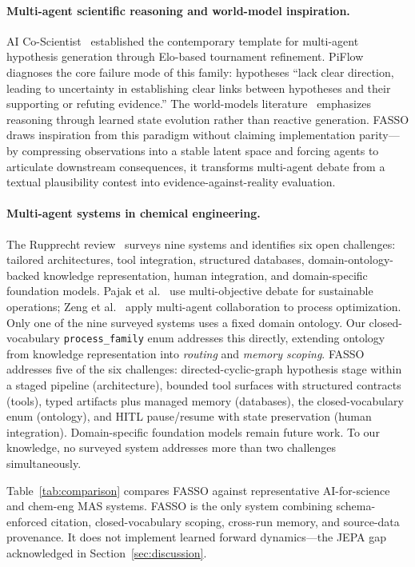 \documentclass[11pt]{article}
\begin{document}
\paragraph{Multi-agent scientific reasoning and world-model inspiration.} 
AI Co-Scientist~\citep{aicoscientist} established the contemporary template for multi-agent hypothesis generation through Elo-based tournament refinement. PiFlow~\citep{piflow} diagnoses the core failure mode of this family: hypotheses ``lack clear direction, leading to uncertainty in establishing clear links between hypotheses and their supporting or refuting evidence.'' The world-models literature~\citep{lecun2022,ha2018,hafner2023} emphasizes reasoning through learned state evolution rather than reactive generation. FASSO draws inspiration from this paradigm without claiming implementation parity—by compressing observations into a stable latent space and forcing agents to articulate downstream consequences, it transforms multi-agent debate from a textual plausibility contest into evidence-against-reality evaluation.

\paragraph{Multi-agent systems in chemical engineering.} 
The Rupprecht review~\citep{rupprecht2026} surveys nine systems and identifies six open challenges: tailored architectures, tool integration, structured databases, domain-ontology-backed knowledge representation, human integration, and domain-specific foundation models. Pajak et al.~\citep{pajak} use multi-objective debate for sustainable operations; Zeng et al.~\citep{zeng} apply multi-agent collaboration to process optimization. Only one of the nine surveyed systems uses a fixed domain ontology. Our closed-vocabulary \texttt{process\_family} enum addresses this directly, extending ontology from knowledge representation into \emph{routing} and \emph{memory scoping}. FASSO addresses five of the six challenges: directed-cyclic-graph hypothesis stage within a staged pipeline (architecture), bounded tool surfaces with structured contracts (tools), typed artifacts plus managed memory (databases), the closed-vocabulary enum (ontology), and HITL pause/resume with state preservation (human integration). Domain-specific foundation models remain future work. To our knowledge, no surveyed system addresses more than two challenges simultaneously.

Table~\ref{tab:comparison} compares FASSO against representative AI-for-science and chem-eng MAS systems. FASSO is the only system combining schema-enforced citation, closed-vocabulary scoping, cross-run memory, and source-data provenance. It does not implement learned forward dynamics—the JEPA gap acknowledged in Section~\ref{sec:discussion}.
\end{document}
